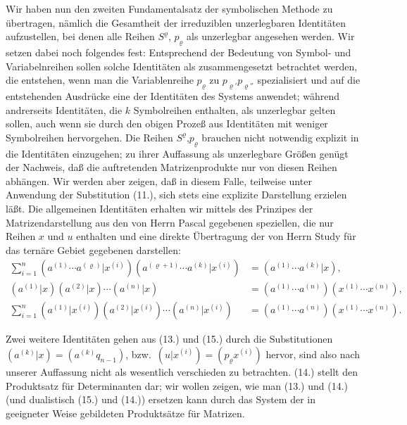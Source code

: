 \documentclass[12pt,a4paper]{article}
\begin{document}
Wir haben nun den zweiten Fundamentalsatz der symbolischen Methode zu übertragen, nämlich die Gesamtheit der irreduziblen unzerlegbaren Identitäten aufzustellen, bei denen alle Reihen $S^{\varrho}$, $p_{\varrho}$ als unzerlegbar angesehen werden. Wir setzen dabei noch folgendes fest: Entsprechend der Bedeutung von Symbol- und Variabelnreihen sollen solche Identitäten als zusammengesetzt betrachtet werden, die entstehen, wenn man die Variablenreihe $p_{\varrho}$ zu $p_{\varrho'} p_{\varrho''}$ spezialisiert und auf die entstehenden Ausdrücke eine der Identitäten des Systems anwendet; während andrerseits Identitäten, die $k$ Symbolreihen enthalten, als unzerlegbar gelten sollen, auch wenn sie durch den obigen Prozeß aus Identitäten mit weniger Symbolreihen hervorgehen. Die Reihen $S^{\varrho}$,$p_{\varrho}$ brauchen nicht notwendig explizit in die Identitäten einzugehen; zu ihrer Auffassung als unzerlegbare Größen genügt der Nachweis, daß die auftretenden Matrizenprodukte nur von diesen Reihen abhängen. Wir werden aber zeigen, daß in diesem Falle, teilweise unter Anwendung der Substitution (11.), sich stets eine explizite Darstellung erzielen läßt. Die allgemeinen Identitäten erhalten wir mittels des Prinzipes der Matrizendarstellung aus den von Herrn Pascal gegebenen speziellen, die nur Reihen $x$ und $u$ enthalten und eine direkte Übertragung der von Herrn Study für das ternäre Gebiet gegebenen darstellen:
\begin{align}\tag{13}
\sum_{i=1}^{n} (a^{(1)} \cdots a^{(\varrho)} | x^{(i)}) (a^{(\varrho+1)} \cdots a^{(k)} | x^{(i)}) &= (a^{(1)} \cdots a^{(k)} | x), \\
\tag{14}
(a^{(1)} | x) (a^{(2)} | x) \cdots (a^{(n)} | x) &= (a^{(1)} \cdots a^{(n)})(x^{(1)} \cdots x^{(n)}), \\
\tag{15}
\sum_{i=1}^{n} (a^{(1)} | x^{(i)}) (a^{(2)} | x^{(i)}) \cdots (a^{(n)} | x^{(i)}) &= (a^{(1)} \cdots a^{(n)})(x^{(1)} \cdots x^{(n)}).
\end{align}

Zwei weitere Identitäten gehen aus (13.) und (15.) durch die Substitutionen $(a^{(k)} | x) = (a^{(k)} q_{n-1})$, bzw.\ $(u | x^{(i)}) = (p_{\varrho} x^{(i)})$ hervor, sind also nach unserer Auffassung nicht als wesentlich verschieden zu betrachten. (14.) stellt den Produktsatz für Determinanten dar; wir wollen zeigen, wie man (13.) und (14.) (und dualistisch (15.) und (14.)) ersetzen kann durch das System der in geeigneter Weise gebildeten Produktsätze für Matrizen.
\end{document}
